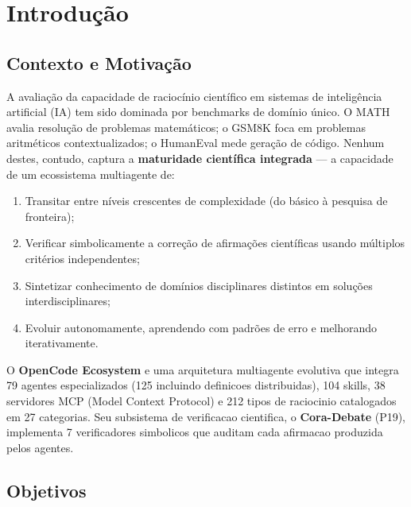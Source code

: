 \documentclass[12pt,a4paper,oneside]{article}
\begin{document}
\newpage
\tableofcontents
\newpage

\section{Introdução}

\subsection{Contexto e Motivação}

A avaliação da capacidade de raciocínio científico em sistemas de inteligência
artificial (IA) tem sido dominada por benchmarks de domínio único. O MATH
\cite{hendrycks2021math} avalia resolução de problemas matemáticos; o GSM8K
\cite{cobbe2021gsm8k} foca em problemas aritméticos contextualizados; o
HumanEval \cite{chen2021humaneval} mede geração de código. Nenhum destes,
contudo, captura a \textbf{maturidade científica integrada} — a capacidade de
um ecossistema multiagente de:

\begin{enumerate}[label=(\roman*)]
\item Transitar entre níveis crescentes de complexidade (do básico à pesquisa
      de fronteira);
\item Verificar simbolicamente a correção de afirmações científicas usando
      múltiplos critérios independentes;
\item Sintetizar conhecimento de domínios disciplinares distintos em soluções
      interdisciplinares;
\item Evoluir autonomamente, aprendendo com padrões de erro e melhorando
      iterativamente.
\end{enumerate}

O \textbf{OpenCode Ecosystem} \cite{opencode2026} e uma arquitetura multiagente
evolutiva que integra 79 agentes especializados (125 incluindo definicoes
distribuidas), 104 skills, 38 servidores MCP
(Model Context Protocol) e 212 tipos de raciocinio catalogados em 27 categorias.
Seu subsistema de verificacao cientifica, o \textbf{Cora-Debate} (P19), implementa
7 verificadores simbolicos que auditam cada afirmacao produzida pelos agentes.

\subsection{Objetivos}
\end{document}
